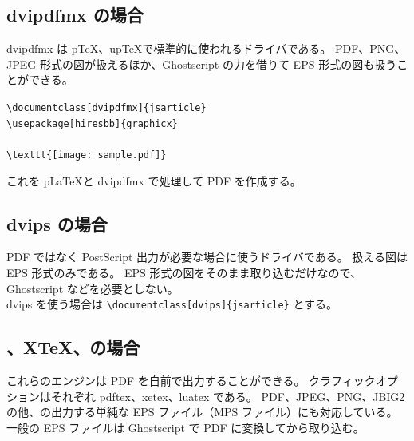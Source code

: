\subsection{dvipdfmx の場合}
dvipdfmx は p\TeX、up\TeX{}で標準的に使われるドライバである。
PDF、PNG、JPEG 形式の図が扱えるほか、Ghostscript の力を借りて EPS 形式の図も扱うことができる。
\begin{mdframed}[roundcorner=0.50zw,leftmargin=3.00zw,rightmargin=3.00zw,skipabove=0.40zw,skipbelow=0.40zw,innertopmargin=4.00pt,innerbottommargin=4.00pt,innerleftmargin=5.00pt,innerrightmargin=5.00pt,linecolor=gray!020,linewidth=0.50pt,backgroundcolor=gray!20]
\verb`\documentclass[dvipdfmx]{jsarticle}`     \\
\verb`\usepackage[hiresbb]{graphicx}`          \\
\verb``                        \\
\verb`\texttt{[image: sample.pdf]}` \\
\verb``
\end{mdframed}
これを p\LaTeX{}と dvipdfmx で処理して PDF を作成する。
\subsection{dvips の場合}
PDF ではなく PostScript 出力が必要な場合に使うドライバである。
扱える図は EPS 形式のみである。
EPS 形式の図をそのまま取り込むだけなので、Ghostscript などを必要としない。\\

dvips を使う場合は \verb`\documentclass[dvips]{jsarticle}` とする。
\subsection{\pdfTeX、X\raisebox{-1.60pt}{{$\exists$}}\hspc{-1.00pt}\TeX、\LuaTeX{}の場合}
これらのエンジンは PDF を自前で出力することができる。
クラフィックオプションはそれぞれ pdftex、xetex、luatex である。
PDF、JPEG、PNG、JBIG2 の他、\MP{}の出力する単純な EPS ファイル（MPS ファイル）にも対応している。
一般の EPS ファイルは Ghostscript で PDF に変換してから取り込む。
